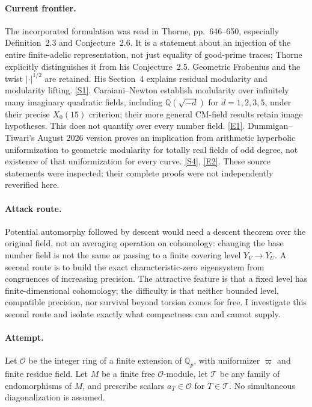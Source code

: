 \documentclass[11pt,a4paper]{article}
\newcommand{\Q}{\mathbb{Q}}
\newcommand{\sref}[2]{\hyperlink{source:#1:#2}{[S#2]}}
\newcommand{\eref}[2]{\hyperlink{extra:#1:#2}{[E#2]}}
\numberwithin{equation}{section}
\begin{document}
\paragraph{Current frontier.}
The incorporated formulation was read in Thorne, pp.~646--650, especially
Definition~2.3 and Conjecture~2.6. It is a statement about an injection of the
entire finite-adelic representation, not just equality of good-prime traces;
Thorne explicitly distinguishes it from his Conjecture~2.5. Geometric
Frobenius and the twist $|\cdot|^{1/2}$ are retained. His Section~4 explains
residual modularity and modularity lifting. \sref{statement}{1}.
Caraiani--Newton establish modularity over infinitely many imaginary quadratic
fields, including $\Q(\sqrt{-d})$ for $d=1,2,3,5$, under their precise
$X_0(15)$ criterion; their more general CM-field results retain image
hypotheses. This does not quantify over every number field. \eref{statement}{1}.
Dummigan--Tiwari's August 2026 version proves an implication from arithmetic
hyperbolic uniformization to geometric modularity for totally real fields of
odd degree, not existence of that uniformization for every curve.
\sref{statement}{4}, \eref{statement}{2}. These source statements were inspected; their
complete proofs were not independently reverified here.

\paragraph{Attack route.}
Potential automorphy followed by descent would need a descent theorem over the
original field, not an averaging operation on cohomology: changing the base
number field is not the same as passing to a finite covering level $Y_V\to Y_U$.
A second route is to build the exact characteristic-zero eigensystem from
congruences of increasing precision. The attractive feature is that a fixed
level has finite-dimensional cohomology; the difficulty is that neither
bounded level, compatible precision, nor survival beyond torsion comes for
free. I investigate this second route and isolate exactly what compactness
can and cannot supply.

\paragraph{Attempt.}
Let $\mathcal O$ be the integer ring of a finite extension of $\Q_p$, with
uniformizer $\varpi$ and finite residue field. Let $M$ be a finite free
$\mathcal O$-module, let $\mathcal T$ be any family of endomorphisms of $M$,
and prescribe scalars $a_T\in\mathcal O$ for $T\in\mathcal T$. No simultaneous
diagonalization is assumed.
\end{document}
